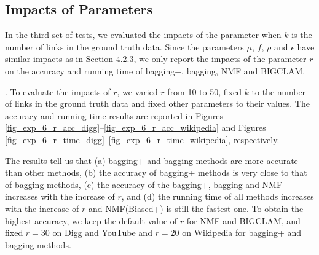\documentclass[10pt,journal,compsoc]{IEEEtran}
\newcommand{\stitle}[1]{\vspace{0.5ex}\noindent{\bf #1}}
\newcommand{\NMF}{{\sf NMF}\xspace }
\newcommand{\BIGCLAM}{{\sf BIGCLAM}\xspace}
\newcommand{\Digg}{{\sf Digg}\xspace}
\newcommand{\YouTube}{{\sf YouTube}\xspace}
\newcommand{\Wikipedia}{{\sf Wikipedia}\xspace}
\newcommand{\Biasedp}{{\sf NMF(Biased+)}\xspace}
\begin{document}
\subsection{Impacts of Parameters}
In the third set of tests, we evaluated the impacts of the parameter when $k$
is the number of links in the ground truth data.
Since the parameters $\mu$, $f$, $\rho$ and $\epsilon$ have similar impacts as
in Section 4.2.3, we only report the impacts of the parameter $r$ on
the accuracy and running time of bagging+, bagging, \NMF and \BIGCLAM.

\stitle{Exp-6: Impacts of $r$}. To evaluate the impacts of $r$, we varied
$r$ from 10 to 50, fixed $k$ to the number of links in the ground truth data
and fixed other parameters to their values. The accuracy and running time results
are reported in Figures \ref{fig_exp_6_r_acc_digg}--\ref{fig_exp_6_r_acc_wikipedia}
and Figures \ref{fig_exp_6_r_time_digg}--\ref{fig_exp_6_r_time_wikipedia}, respectively.

The results tell us that (a) bagging+ and bagging methods are more accurate than
other methods, (b) the accuracy of bagging+ methods is very close to that of bagging methods,
(c) the accuracy of the bagging+, bagging and \NMF increases with the increase of $r$,
and (d) the running time of all methods increases with the increase of $r$ and \Biasedp
is still the fastest one. To obtain the highest accuracy, we keep the default value of
$r$ for \NMF and \BIGCLAM, and fixed $r = 30$ on \Digg and \YouTube and $r = 20$ on
\Wikipedia for bagging+ and bagging methods.
\end{document}
